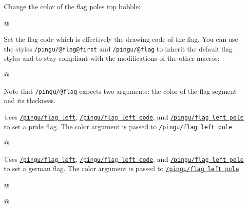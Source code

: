 \documentclass[parskip=half,english,numbers=noenddot,footnotes=nomultiple,oneside]{scrartcl}
\def\lpingu#1{\lstinline[style=lstpingu,language=pingulang]'#1'}
\newcommand*\keyref[2][/pingu/]{\hyperref[pk:#1#2]{\lpingu{#1#2}}}
\begin{document}
Change the color of the flag poles top bobble:
	\begin{tcblisting}{@}
\begin{tikzpicture}
	\pingu[flag left, flag left bobble=green]
\end{tikzpicture}
\end{tcblisting}
\endsubkeyexplain

Set the flag code which is effectively the drawing code of the flag.
You can use the styles \lpingu{/pingu/@flag@first} and \lpingu{/pingu/@flag} to inherit the default flag styles and to stay compliant with the modifications of the other macros:
	\begin{tcblisting}{@}
\begin{tikzpicture}
	\pingu[flag left, flag left code={
	  \node[/pingu/@flag@first,
	  	/pingu/@flag={blue}{5mm}]
	  		(upper) at (0,0) {};
	  \node[below,/pingu/@flag={black}{4mm}]
	  	(lower) at (upper.south) {};
	}]
\end{tikzpicture}
\end{tcblisting}
Note that \lpingu{/pingu/@flag} expects two arguments: the color of the flag segment and its thickness.
\endsubkeyexplain

	Uses \keyref{flag left}, \keyref{flag left code}, and \keyref{flag left pole} to set a pride flag. The color argument is passed to \keyref{flag left pole}.
\begin{tcblisting}{@}
\begin{tikzpicture}
	\pingu[pride flag left=green]
\end{tikzpicture}
\end{tcblisting}
\endshowkeyexplain


	Uses \keyref{flag left}, \keyref{flag left code}, and \keyref{flag left pole} to set a german flag. The color argument is passed to \keyref{flag left pole}.
\begin{tcblisting}{@}
\begin{tikzpicture}
	\pingu[german flag left=green]
\end{tikzpicture}
\end{tcblisting}
\endshowkeyexplain


\begin{tcblisting}{@}
\begin{tikzpicture}
	\pingu[flag right=green]
\end{tikzpicture}
\end{tcblisting}
\endshowkeyexplain
\end{document}
